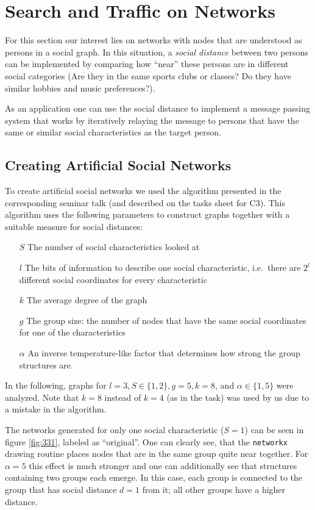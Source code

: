 \documentclass{scrartcl}
\begin{document}
\section{Search and Traffic on Networks}
For this section our interest lies on networks with nodes that are
understood as persons in a social graph. In this situation, a \emph{social
distance} between two persons can be implemented by comparing how
\enquote{near} these persons are in different social categories
(Are they in the same sports clubs or classes? Do they have similar hobbies
and music preferences?). 

As an application one can use the social distance
to implement a message passing system that works by iteratively relaying
the message to persons that have the same or similar social characteristics
as the target person.

\subsection{Creating Artificial Social Networks}
To create artificial social networks we used the algorithm presented
in the corresponding seminar talk (and described on the tasks sheet for
C3). This algorithm uses the following parameters to construct graphs
together with a suitable measure for social distances:
\begin{itemize}
    \item[$S$] The number of social characteristics looked at
    \item[$l$] The bits of information to describe one social
        characteristic, i.e.\ there are $2^l$ different social coordinates
        for every characteristic
    \item[$k$] The average degree of the graph
    \item[$g$] The group size: the number of nodes that have the same
        social coordinates for one of the characteristics
    \item[$\alpha$] An inverse temperature-like factor that determines how strong the
        group structures are.
\end{itemize}
In the following, graphs for $l = 3, S\in\{1, 2\}, g = 5, k = 8$, and
$\alpha\in\{1, 5\}$ were analyzed. Note that $k = 8$ instead of $k = 4$ (as
in the task) was used by us due to a mistake in the algorithm.

The networks generated for only one social characteristic ($S = 1$) can be
seen in figure \ref{fig:331}, labeled as \enquote{original}. One can
clearly see, that the \texttt{networkx} drawing routine places nodes that
are in the same group quite near together. For $\alpha = 5$ this effect is much
stronger and one can additionally see that structures containing two groups
each emerge. In this case, each group is connected to the group that has 
social distance $d = 1$ from it; all other groups have a higher distance.
\end{document}
